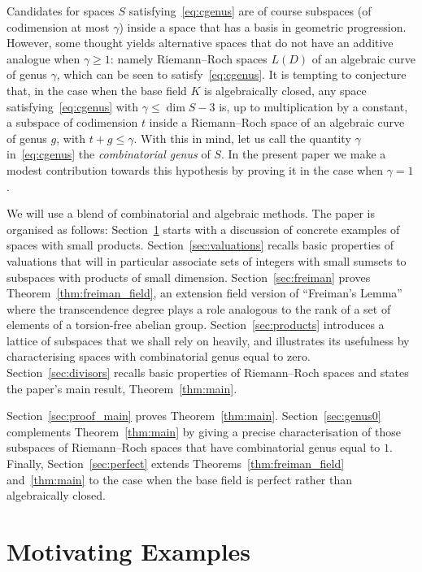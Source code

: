 \documentclass[10pt]{amsart}
\theoremstyle{definition}
\theoremstyle{remark}
\renewcommand{\geq}{\geqslant}
\renewcommand{\leq}{\leqslant}
\begin{document}
Candidates for spaces $S$ satisfying~\eqref{eq:cgenus} are of course subspaces (of codimension at most $\gamma$) inside a space that has a basis in geometric progression. However, some thought yields alternative spaces that do not have an additive analogue when $\gamma\geq1$: namely Riemann--Roch spaces $L(D)$ of an algebraic curve of genus $\gamma$, which {can be} seen to satisfy~\eqref{eq:cgenus}. It is tempting to conjecture that, in the case when the base field $K$ is algebraically closed, any space satisfying~\eqref{eq:cgenus} {with $\gamma\leq\dim S-3$} is, up to multiplication by a constant, a subspace of codimension $t$ inside a Riemann--Roch space of an algebraic curve of genus $g$, with $t+g\leq\gamma$. With this in mind, let us call the quantity $\gamma$ in~\eqref{eq:cgenus} the \emph{combinatorial genus} of $S$. In the present paper we make a modest contribution towards this hypothesis by proving it in the case when $\gamma=1$.

We will use a blend of combinatorial and algebraic methods. The paper is organised as follows: {Section~\ref{sec:examples} starts with a discussion of concrete examples of spaces with small products.} Section~\ref{sec:valuations} recalls basic properties of valuations that will in particular associate sets of integers with small sumsets to subspaces with products of small dimension. Section~\ref{sec:freiman} proves {Theorem~\ref{thm:freiman_field}}, an extension field version of ``Freiman's Lemma'' where the transcendence degree plays a role analogous to the rank of a set of elements of a torsion-free abelian group. Section~\ref{sec:products} introduces a lattice of subspaces that we shall rely on heavily, and illustrates its usefulness by characterising spaces with combinatorial genus equal to zero. Section~\ref{sec:divisors} recalls basic properties of Riemann--Roch spaces and states the paper's main result, Theorem~\ref{thm:main}.

Section~\ref{sec:proof_main} proves Theorem~\ref{thm:main}. Section~\ref{sec:genus0} complements Theorem~\ref{thm:main} by giving a precise characterisation of those subspaces of Riemann--Roch spaces that have combinatorial genus equal to $1$. Finally, Section~\ref{sec:perfect} extends Theorems~\ref{thm:freiman_field} and~\ref{thm:main} to the case when the base field is perfect rather than algebraically closed.

\section{{Motivating Examples}}\label{sec:examples}
\end{document}
